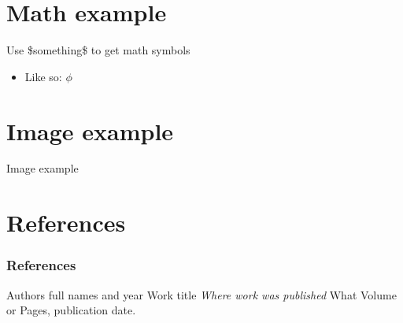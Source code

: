\documentclass{beamer}
\begin{document}

\section{Math example}
\begin{frame}{Use \$something\$ to get math symbols}
    \begin{itemize}
        \item Like so: $\phi$
    \end{itemize}
\end{frame}


\section{Image example}
\begin{frame}{Image example}
    \begin{figure}
        \centering
        \label{fig:1}
    \end{figure}
\end{frame}


\section{References}
\begin{frame}
    \frametitle{References}
    \footnotesize{
        \begin{thebibliography}{99} %
             Authors full names and year
            \newblock Work title
            \newblock \emph{Where work was published} What Volume or Pages, publication date.
        \end{thebibliography}
    }
\end{frame}


\begin{frame}
    \titlepage
\end{frame}

\end{document}
